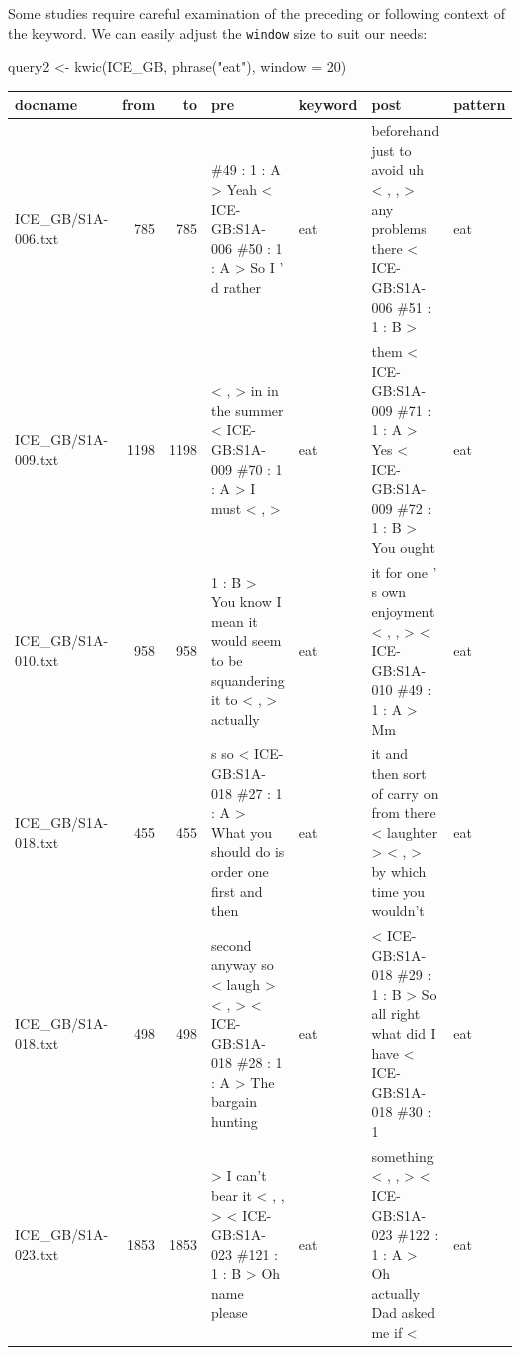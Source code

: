 \documentclass[
  11pt,
  letterpaper,
  DIV=11,
  numbers=noendperiod]{scrreprt}
\newenvironment{Shaded}{\begin{snugshade}}{\end{snugshade}}
\newcommand{\AttributeTok}[1]{\textcolor[rgb]{0.40,0.45,0.13}{#1}}
\newcommand{\DecValTok}[1]{\textcolor[rgb]{0.68,0.00,0.00}{#1}}
\newcommand{\FunctionTok}[1]{\textcolor[rgb]{0.28,0.35,0.67}{#1}}
\newcommand{\NormalTok}[1]{\textcolor[rgb]{0.00,0.23,0.31}{#1}}
\newcommand{\OtherTok}[1]{\textcolor[rgb]{0.00,0.23,0.31}{#1}}
\newcommand{\StringTok}[1]{\textcolor[rgb]{0.13,0.47,0.30}{#1}}
\begin{document}
Some studies require careful examination of the preceding or following
context of the keyword. We can easily adjust the \texttt{window} size to
suit our needs:

\begin{Shaded}
\begin{Highlighting}[]
\NormalTok{query2 }\OtherTok{\textless{}{-}} \FunctionTok{kwic}\NormalTok{(ICE\_GB, }\FunctionTok{phrase}\NormalTok{(}\StringTok{"eat"}\NormalTok{), }\AttributeTok{window =} \DecValTok{20}\NormalTok{) }
\end{Highlighting}
\end{Shaded}

\begin{table}
\centering
\begin{tabular}[t]{l|r|r|l|l|l|l}
\hline
docname & from & to & pre & keyword & post & pattern\\
\hline
ICE\_GB/S1A-006.txt & 785 & 785 & \#49 : 1 : A > Yeah < ICE-GB:S1A-006 \#50 : 1 : A > So I ' d rather & eat & beforehand just to avoid uh < , , > any problems there < ICE-GB:S1A-006 \#51 : 1 : B > & eat\\
\hline
ICE\_GB/S1A-009.txt & 1198 & 1198 & < , > in in the summer < ICE-GB:S1A-009 \#70 : 1 : A > I must < , > & eat & them < ICE-GB:S1A-009 \#71 : 1 : A > Yes < ICE-GB:S1A-009 \#72 : 1 : B > You ought & eat\\
\hline
ICE\_GB/S1A-010.txt & 958 & 958 & 1 : B > You know I mean it would seem to be squandering it to < , > actually & eat & it for one ' s own enjoyment < , , > < ICE-GB:S1A-010 \#49 : 1 : A > Mm & eat\\
\hline
ICE\_GB/S1A-018.txt & 455 & 455 & s so < ICE-GB:S1A-018 \#27 : 1 : A > What you should do is order one first and then & eat & it and then sort of carry on from there < laughter > < , > by which time you wouldn't & eat\\
\hline
ICE\_GB/S1A-018.txt & 498 & 498 & second anyway so < laugh > < , > < ICE-GB:S1A-018 \#28 : 1 : A > The bargain hunting & eat & < ICE-GB:S1A-018 \#29 : 1 : B > So all right what did I have < ICE-GB:S1A-018 \#30 : 1 & eat\\
\hline
ICE\_GB/S1A-023.txt & 1853 & 1853 & > I can't bear it < , , > < ICE-GB:S1A-023 \#121 : 1 : B > Oh name please & eat & something < , , > < ICE-GB:S1A-023 \#122 : 1 : A > Oh actually Dad asked me if < & eat\\
\hline
\end{tabular}
\end{table}
\end{document}

